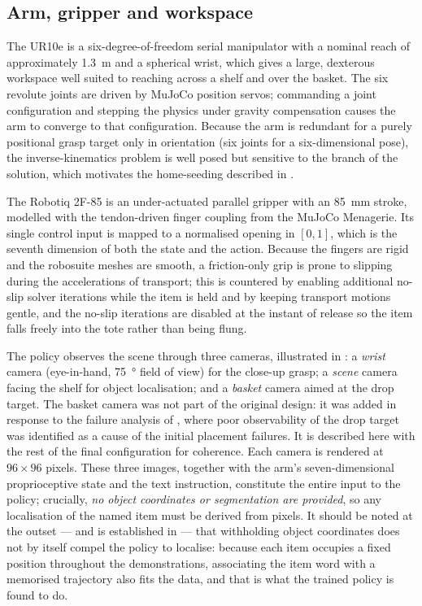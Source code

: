 \subsection{Arm, gripper and workspace}
\label{sec:m-arm}
The UR10e is a six-degree-of-freedom serial manipulator with a nominal reach of
approximately \SI{1.3}{m} and a spherical wrist, which gives a large, dexterous
workspace well suited to reaching across a shelf and over the basket. The six
revolute joints are driven by MuJoCo position servos; commanding a joint
configuration and stepping the physics under gravity compensation causes the arm to
converge to that configuration. Because the arm is redundant for a purely positional
grasp target only in orientation (six joints for a six-dimensional pose), the
inverse-kinematics problem is well posed but sensitive to the branch of the solution,
which motivates the home-seeding described in .

The Robotiq 2F-85 is an under-actuated parallel gripper with an \SI{85}{mm} stroke,
modelled with the tendon-driven finger coupling from the MuJoCo Menagerie. Its single
control input is mapped to a normalised opening in $[0,1]$, which is the seventh
dimension of both the state and the action. Because the fingers are rigid and the
robosuite meshes are smooth, a friction-only grip is prone to slipping during the
accelerations of transport; this is countered by enabling additional no-slip solver
iterations while the item is held and by keeping transport motions gentle, and the
no-slip iterations are disabled at the instant of release so the item falls freely
into the tote rather than being flung.

The policy observes the scene through three cameras, illustrated in
: a \emph{wrist} camera (eye-in-hand, \SI{75}{\degree} field of
view) for the close-up grasp; a \emph{scene} camera facing the shelf for object
localisation; and a \emph{basket} camera aimed at the drop target. The basket camera
was not part of the original design: it was added in response to the failure analysis
of , where poor observability of the drop target was
identified as a cause of the initial placement failures. It is described here with the
rest of the final configuration for coherence. Each camera is rendered at
$96\times96$ pixels. These three images, together with the arm's
seven-dimensional proprioceptive state and the text instruction, constitute the
entire input to the policy; crucially, \emph{no object coordinates or segmentation
are provided}, so any localisation of the named item must be derived from pixels. It
should be noted at the outset --- and is established in  ---
that withholding object coordinates does not by itself compel the policy to localise:
because each item occupies a fixed position throughout the demonstrations, associating
the item word with a memorised trajectory also fits the data, and that is what the
trained policy is found to do.


